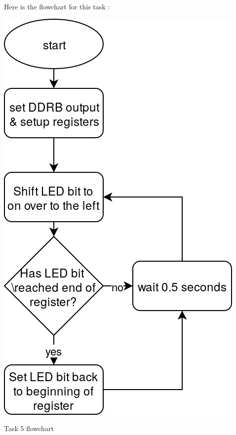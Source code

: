 \documentclass[a4paper,12pt]{article}
\begin{document}
Here is the flowchart for this task : 
\begin{center}
\includegraphics[width=\textwidth/2 ]{flowchart/task5_flowchart.jpg}

Task 5 flowchart
\label{task5}
\end{center}

\break 



\end{document}
